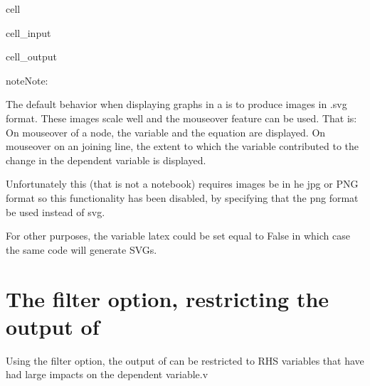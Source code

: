 \documentclass[letterpaper,10pt,english]{jupyterBook}
\begin{document}
\begin{sphinxuseclass}{cell}\begin{sphinxVerbatimInput}

\begin{sphinxuseclass}{cell_input}
\begin{sphinxVerbatim}[commandchars=\\\{\}]
\end{sphinxVerbatim}

\end{sphinxuseclass}\end{sphinxVerbatimInput}
\begin{sphinxVerbatimOutput}

\begin{sphinxuseclass}{cell_output}
\noindent{}

\end{sphinxuseclass}\end{sphinxVerbatimOutput}

\end{sphinxuseclass}
\begin{sphinxadmonition}{note}{Note:}
\sphinxAtStartPar
{}

\sphinxAtStartPar
The default behavior when displaying graphs in a  is to produce images in .svg format.
These images scale well and the mouseover feature can be used. That is: On mouseover of a node, the variable and the equation are displayed.  On mouseover on an joining line, the extent to which the variable contributed to the change in the dependent variable is displayed.

\sphinxAtStartPar
Unfortunately this  (that is not a notebook) requires images be in he jpg or PNG format so this functionality has been disabled, by specifying that the png format be used instead of svg.

\sphinxAtStartPar
For other purposes, the variable latex could be set equal to False in which case the same code will generate SVGs.
\end{sphinxadmonition}


\section{The filter option, restricting the output of }
\label{\detokenize{content/06_ModelAnalytics/ModelStructure:the-filter-option-restricting-the-output-of-tracepre}}
\sphinxAtStartPar
Using the filter option, the output of  can be restricted to RHS variables that have had large impacts on the dependent variable.v
\end{document}
